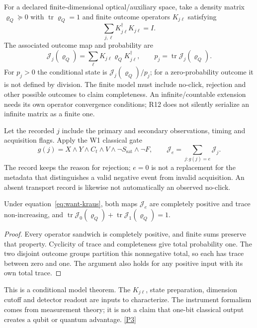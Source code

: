 For a declared finite-dimensional optical/auxiliary space, take a density
matrix $\varrho_Q\succeq0$ with $\operatorname{tr}\varrho_Q=1$ and finite
outcome operators $K_{j\ell}$ satisfying
\begin{equation}
 \sum_{j,\ell}K_{j\ell}^\dagger K_{j\ell}=I.
 \label{eq:want-kraus}
\end{equation}
The associated outcome map and probability are
\begin{equation}
 \mathcal J_j(\varrho_Q)=\sum_\ell
 K_{j\ell}\varrho_QK_{j\ell}^\dagger,
 \qquad p_j=\operatorname{tr}\mathcal J_j(\varrho_Q).
 \label{eq:want-instrument}
\end{equation}
For $p_j>0$ the conditional state is $\mathcal J_j(\varrho_Q)/p_j$; for a
zero-probability outcome it is not defined by division. The finite model must
include no-click, rejection and other possible outcomes to claim completeness.
An infinite/countable extension needs its own operator convergence conditions;
R12 does not silently serialize an infinite matrix as a finite one.

Let the recorded $j$ include the primary and secondary observations, timing
and acquisition flags. Apply the W1 classical gate
\begin{equation}
 g(j)=X\land Y\land C_t\land V\land\neg S_{\mathrm{sat}}\land\neg F,
 \qquad
 \mathcal J_e=\sum_{j:g(j)=e}\mathcal J_j.
 \label{eq:want-quantum-event}
\end{equation}
The record keeps the reason for rejection; $e=0$ is not a replacement for the
metadata that distinguishes a valid negative event from invalid acquisition.
An absent transport record is likewise not automatically an observed no-click.

\begin{proposition}
Under equation~\eqref{eq:want-kraus}, both maps $\mathcal J_e$ are completely
positive and trace non-increasing, and
$\operatorname{tr}\mathcal J_0(\varrho_Q)+
 \operatorname{tr}\mathcal J_1(\varrho_Q)=1$.
\end{proposition}
\begin{proof}
Every operator sandwich is completely positive, and finite sums preserve that
property. Cyclicity of trace and completeness give total probability one.
The two disjoint outcome groups partition this nonnegative total, so each has
trace between zero and one. The argument also holds for any positive input
with its own total trace.
\end{proof}
This is a conditional model theorem. The $K_{j\ell}$, state preparation,
dimension cutoff and detector readout are inputs to characterize. The
instrument formalism comes from measurement theory; it is not a claim that
one-bit classical output creates a qubit or quantum advantage.
\href{https://link.springer.com/article/10.1007/BF01647093}{[P3]}

